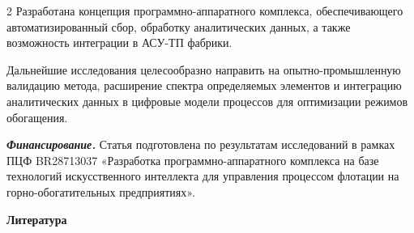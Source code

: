 \begin{multicols}{2}
Разработана концепция программно-аппаратного комплекса, обеспечивающего
автоматизированный сбор, обработку аналитических данных, а также
возможность интеграции в АСУ-ТП фабрики.

Дальнейшие исследования целесообразно направить на опытно-промышленную
валидацию метода, расширение спектра определяемых элементов и интеграцию
аналитических данных в цифровые модели процессов для оптимизации режимов
обогащения.

\emph{{\bfseries Финансирование.}} Статья подготовлена по результатам
исследований в рамках ПЦФ BR28713037 «Разработка программно-аппаратного
комплекса на базе технологий искусственного интеллекта для управления
процессом флотации на горно-обогатительных предприятиях».
\end{multicols}

\begin{center}
{\bfseries Литература}
\end{center}

